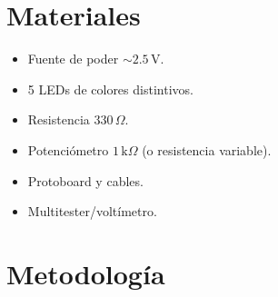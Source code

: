\documentclass[11pt,twocolumn]{article}
\begin{document}
\section{Materiales}
\begin{itemize}
    \item Fuente de poder $\sim 2.5\,\mathrm{V}$.
    \item 5 LEDs de colores distintivos.
    \item Resistencia $330\,\Omega$.
    \item Potenciómetro $1\,\mathrm{k}\Omega$ (o resistencia variable).
    \item Protoboard y cables.
    \item Multitester/voltímetro.
\end{itemize}


\section{Metodología}
\end{document}

